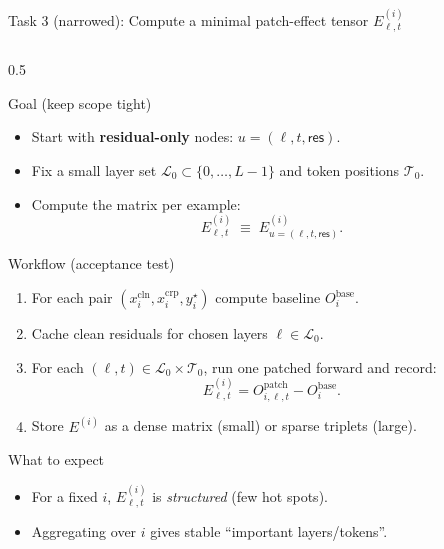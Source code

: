 \documentclass[aspectratio=169,xcolor={dvipsnames}]{beamer}
\renewcommand{\accent}[1]{\textbf{#1}}
\begin{document}
\begin{frame}[fragile,shrink=44]{Task 3 (narrowed): Compute a minimal patch-effect tensor $E^{(i)}_{\ell,t}$}
\small
\begin{columns}[T,onlytextwidth]
\begin{column}{0.5\textwidth}
\begin{block}{Goal (keep scope tight)}
\begin{itemize}\setlength\itemsep{3pt}
\item Start with \accent{residual-only} nodes: $u=(\ell,t,\textsf{res})$.
\item Fix a small layer set $\mathcal{L}_0\subset\{0,\dots,L-1\}$ and token positions $\mathcal{T}_0$.
\item Compute the matrix per example:
\[
E^{(i)}_{\ell,t} \;\equiv\; E^{(i)}_{u=(\ell,t,\textsf{res})}.
\]
\end{itemize}
\end{block}

\begin{block}{Workflow (acceptance test)}
\begin{enumerate}\setlength\itemsep{2pt}
\item For each pair $(x_i^{\mathrm{cln}},x_i^{\mathrm{crp}},y_i^\star)$ compute baseline $O_i^{\text{base}}$.
\item Cache clean residuals for chosen layers $\ell\in\mathcal{L}_0$.
\item For each $(\ell,t)\in\mathcal{L}_0\times\mathcal{T}_0$, run one patched forward and record:
\[
E^{(i)}_{\ell,t}=O^{\text{patch}}_{i,\ell,t}-O^{\text{base}}_i.
\]
\item Store $E^{(i)}$ as a dense matrix (small) or sparse triplets (large).
\end{enumerate}
\end{block}

\begin{block}{What to expect}
\begin{itemize}\setlength\itemsep{2pt}
\item For a fixed $i$, $E^{(i)}_{\ell,t}$ is \emph{structured} (few hot spots).
\item Aggregating over $i$ gives stable “important layers/tokens”.
\end{itemize}
\end{block}
\end{column}


\end{columns}
\end{frame}
\end{document}
